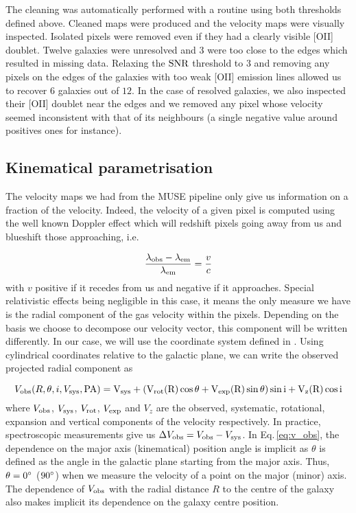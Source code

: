 The cleaning was automatically performed with a routine using both thresholds defined above. Cleaned maps were produced and the velocity maps were visually inspected. Isolated pixels were removed even if they had a clearly visible [OII] doublet. Twelve galaxies were unresolved and $3$ were too close to the edges which resulted in missing data. Relaxing the $\rm{SNR}$ threshold to $3$ and removing any pixels on the edges of the galaxies with too weak [OII] emission lines allowed us to recover $6$ galaxies out of $12$. In the case of resolved galaxies, we also inspected their [OII] doublet near the edges and we removed any pixel whose velocity seemed inconsistent with that of its neighbours (a single negative value around positives ones for instance). 

\subsection{Kinematical parametrisation}

The velocity maps we had from the MUSE pipeline only give us information on a fraction of the velocity. Indeed, the velocity of a given pixel is computed using the well known Doppler effect which will redshift pixels going away from us and blueshift those approaching, i.e.

\begin{equation}
	\frac{\lambda_{\rm{obs}} - \lambda_{\rm{em}}}{\lambda_{\rm{em}}} = \frac{v}{c}
\end{equation}
with $v$ positive if it recedes from us and negative if it approaches. Special relativistic effects being negligible in this case, it means the only measure we have is the radial component of the gas velocity within the pixels. Depending on the basis we choose to decompose our velocity vector, this component will be written differently. In our case, we will use the coordinate system defined in . Using cylindrical coordinates relative to the galactic plane, we can write the observed projected radial component as 

\begin{equation}
	V_{\rm{obs}} ( R, \theta , i, V_{\rm{sys}} , \rm{PA} ) = V_{\rm{sys}} + \left ( V_{\rm{rot}} (R) \cos \theta + V_{\rm{exp}} (R) \sin \theta \right ) \sin i + V_z (R) \cos i
	\label{eq:v_obs}
\end{equation}
where $V_{\rm{obs}}$, $V_{\rm{sys}}$, $V_{\rm{rot}}$, $V_{\rm{exp}}$ and $V_z$ are the observed,  systematic, rotational, expansion and vertical components of the velocity respectively. In practice, spectroscopic measurements give us $\Delta V_{\rm{obs}} = V_{\rm{obs}} - V_{\rm{sys}}$. In Eq.\,\ref{eq:v_obs}, the dependence on the major axis (kinematical) position angle is implicit as $\theta$ is defined as the angle in the galactic plane starting from the major axis. Thus, $\theta = 0 \degree$ ($90 \degree$) when we measure the velocity of a point on the major (minor) axis. The dependence of $V_{\rm{obs}}$ with the radial distance $R$ to the centre of the galaxy also makes implicit its dependence on the galaxy centre position.

